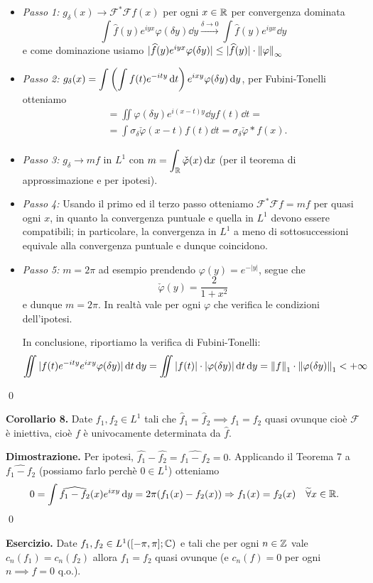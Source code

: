 \begin{itemize}
	\item \textit{Passo 1:}
		$g_\delta(x) \to \mathcal F^* \mathcal F f(x)$ per ogni $x \in \mathbb R$ per convergenza dominata
		$$
		\int \hat f(y) e^{iyx} \varphi(\delta y) \dd y \xrightarrow{\delta \to 0} 
		\int \hat f(y) e^{iyx} \dd y
		$$
		e come dominazione usiamo $|\widehat f(y) e^{iyx} \varphi(\delta y)| \leq |\widehat f(y)| \cdot \left\lVert \varphi \right\rVert_\infty$

	\item \textit{Passo 2:}
		$\displaystyle g_\delta(x) = \int \left( \int f(t) e^{-ity} \,\mathrm{d} t \right) e^{ixy} \varphi(\delta y) \,\mathrm{d} y$, per Fubini-Tonelli otteniamo
			$$
			\begin{aligned}
				&= \iint \varphi(\delta y) e^{i(x-t)y} \dd y f(t) \dd t = \\
				&= \int \sigma_\delta \check \varphi(x - t) f(t) \dd t = \sigma_\delta \check \varphi \ast f(x).
			\end{aligned}
			$$
	\item \textit{Passo 3:}
		$g_\delta \to m f$ in $L^1$ con $\displaystyle m = \int_\mathbb R \check \varphi(x) \,\mathrm{d} x$ (per il teorema di approssimazione e per ipotesi).

	\item \textit{Passo 4:}
		Usando il primo ed il terzo passo otteniamo $\mathcal F^* \mathcal F f = m f$ per quasi ogni $x$, in quanto la convergenza puntuale e quella in $L^1$ devono essere compatibili; in particolare, la convergenza in $L^1$ a meno di sottosuccessioni equivale alla convergenza puntuale e dunque coincidono.

	\item \textit{Passo 5:}
		$m = 2\pi$ ad esempio prendendo $\varphi(y) = e^{-|y|}$, segue che
		$$
		\check \varphi(y) = \frac{2}{1 + x^2}
		$$
		e dunque $m = 2\pi$. In realtà vale per ogni $\varphi$ che verifica le condizioni dell'ipotesi.

		\vs

		In conclusione, riportiamo la verifica di Fubini-Tonelli:
		$$
		\iint |f(t) e^{-ity} e^{ixy} \varphi(\delta y)| \,\mathrm{d} t \,\mathrm{d} y = \iint |f(t)| \cdot |\varphi(\delta y)| \,\mathrm{d} t \,\mathrm{d} y = \left\lVert f \right\rVert_1 \cdot \left\lVert \varphi(\delta y) \right\rVert_1 < +\infty
		$$
\end{itemize}
\qed

\textbf{Corollario 8.}
Date $f_1, f_2 \in L^1$ tali che $\hat f_1 = \hat f_2 \implies f_1 = f_2$ quasi ovunque cioè $\mathcal F$ è iniettiva, cioè $f$ è univocamente determinata da $\hat f$.

\textbf{Dimostrazione.} Per ipotesi, $\hat{f_1} - \hat{f_2} = \hat{f_1 - f_2} = 0$.
Applicando il Teorema 7 a $\hat{f_1 - f_2}$ (possiamo farlo perchè $0 \in L^1$) otteniamo
%
$$
	0 = \int \widehat{f_1 - f_2}(x) e^{ixy} \,\mathrm{d} y = 2\pi (f_1(x) - f_2(x)) 
	\Rightarrow f_1(x) = f_2(x) \quad \widetilde\forall x \in \mathbb R.
$$
%
\qed


\textbf{Esercizio.}
Date $f_1, f_2 \in L^1([-\pi, \pi]; \mathbb C)$ e tali che per ogni $n \in \mathbb Z$ vale $c_n(f_1) = c_n(f_2)$ allora $f_1 = f_2$ quasi ovunque (e $c_n(f) = 0$ per ogni $n \implies f = 0$ q.o.).









